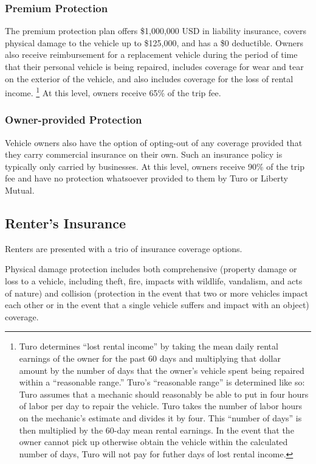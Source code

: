 \documentclass[review,12pt]{elsarticle}
\begin{document}
\subsubsection{Premium Protection}\label{owner-premium-protection}
The premium protection plan offers \$1,000,000 USD in liability insurance, covers physical damage to the vehicle up to \$125,000, and has a \$0 deductible. Owners also receive reimbursement for a replacement vehicle during the period of time that their personal vehicle is being repaired, includes coverage for wear and tear on the exterior of the vehicle, and also includes coverage for the loss of rental income.
\footnote{Turo determines ``lost rental income'' by taking the mean daily rental earnings of the owner for the past 60 days and multiplying that dollar amount by the number of days that the owner's vehicle spent being repaired within a ``reasonable range.'' Turo's ``reasonable range'' is determined like so: Turo assumes that a mechanic should reasonably be able to put in four hours of labor per day to repair the vehicle. Turo takes the number of labor hours on the mechanic's estimate and divides it by four. This ``number of days'' is then multiplied by the 60-day mean rental earnings. In the event that the owner cannot pick up otherwise obtain the vehicle within the calculated number of days, Turo will not pay for futher days of lost rental income.
}
At this level, owners receive 65\% of the trip fee.

\subsubsection{Owner-provided Protection}
Vehicle owners also have the option of opting-out of any coverage provided that they carry commercial insurance on their own. Such an insurance policy is typically only carried by businesses. At this level, owners receive 90\% of the trip fee and have no protection whatsoever provided to them by Turo or Liberty Mutual.

\subsection{Renter's Insurance}\label{renters-insurance}
Renters are presented with a trio of insurance coverage options.

Physical damage protection includes both comprehensive (property damage or loss to a vehicle, including theft, fire, impacts with wildlife,  vandalism, and acts of nature) and collision (protection in the event that two or more vehicles impact each other or in the event that a single vehicle suffers and impact with an object) coverage.
\end{document}
